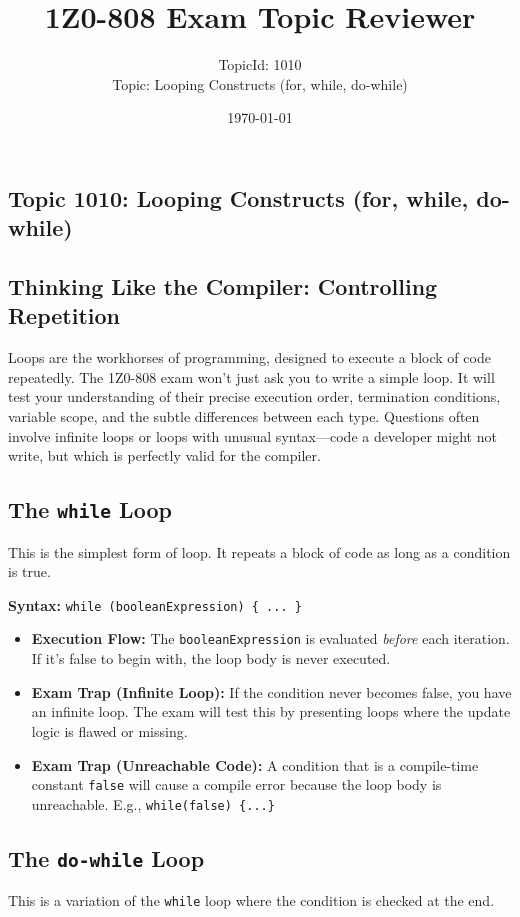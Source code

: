 \documentclass[12pt]{article}
\title{\textbf{1Z0-808 Exam Topic Reviewer}}
\author{TopicId: 1010 \\ Topic: Looping Constructs (for, while, do-while)}
\date{\today}
\begin{document}
\maketitle
\newpage\begin{enumerate}[label=(\arabic*)]
\section*{Topic 1010: Looping Constructs (for, while, do-while)}

\subsection*{Thinking Like the Compiler: Controlling Repetition}
Loops are the workhorses of programming, designed to execute a block of code repeatedly. The 1Z0-808 exam won't just ask you to write a simple loop. It will test your understanding of their precise execution order, termination conditions, variable scope, and the subtle differences between each type. Questions often involve infinite loops or loops with unusual syntax—code a developer might not write, but which is perfectly valid for the compiler.

\subsection*{The \texttt{while} Loop}
This is the simplest form of loop. It repeats a block of code as long as a condition is true.

\textbf{Syntax:} \texttt{while (booleanExpression) \{ ... \}}
\begin{itemize}
    \item \textbf{Execution Flow:} The \texttt{booleanExpression} is evaluated \textit{before} each iteration. If it's false to begin with, the loop body is never executed.
    \item \textbf{Exam Trap (Infinite Loop):} If the condition never becomes false, you have an infinite loop. The exam will test this by presenting loops where the update logic is flawed or missing.
    \item \textbf{Exam Trap (Unreachable Code):} A condition that is a compile-time constant \texttt{false} will cause a compile error because the loop body is unreachable. E.g., \texttt{while(false) \{...\}}
\end{itemize}

\subsection*{The \texttt{do-while} Loop}
This is a variation of the \texttt{while} loop where the condition is checked at the end.


\end{enumerate}
\end{document}
